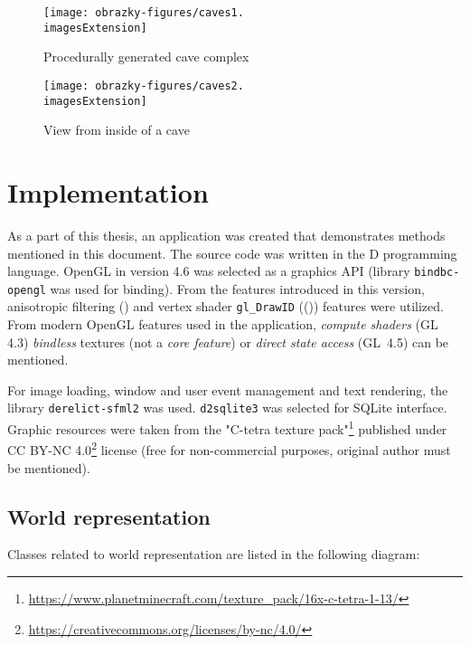\begin{figure}[H]
	\texttt{[image: obrazky-figures/caves1.\\imagesExtension]}
	\caption{Procedurally generated cave complex}
\end{figure}

\vfill

\begin{figure}[H]
	\texttt{[image: obrazky-figures/caves2.\\imagesExtension]}
	\caption{View from inside of a cave}
\end{figure}

\begin{comment}
\begin{figure}[H]
	\texttt{[image: obrazky-figures/caves3.\\imagesExtension]}
	\caption{Vstup do jeskyní}
\end{figure}
\end{comment}

\chapter{Implementation} \label{ch:impl}
As a part of this thesis, an application was created that demonstrates methods mentioned in this document. The source code was written in the D programming language. OpenGL in version 4.6 was selected as a graphics API (library \texttt{bindbc-opengl} was used for binding). From the features introduced in this version, anisotropic filtering () and vertex shader \verb|gl_DrawID| (()) features were utilized. From modern OpenGL features used in the application, \textit{compute shaders} (GL 4.3) \textit{bindless} textures (not a \textit{core feature}) or \textit{direct state access} (GL~4.5) can be mentioned.

For image loading, window and user event management and text rendering, the library \texttt{derelict-sfml2} was used. \texttt{d2sqlite3} was selected for SQLite interface. Graphic resources were taken from the "C-tetra texture pack"\footnote{\url{https://www.planetminecraft.com/texture_pack/16x-c-tetra-1-13/}} published under CC BY-NC 4.0\footnote{\url{https://creativecommons.org/licenses/by-nc/4.0/}} license (free for non-commercial purposes, original author must be mentioned).

\section{World representation}
Classes related to world representation are listed in the following diagram:

